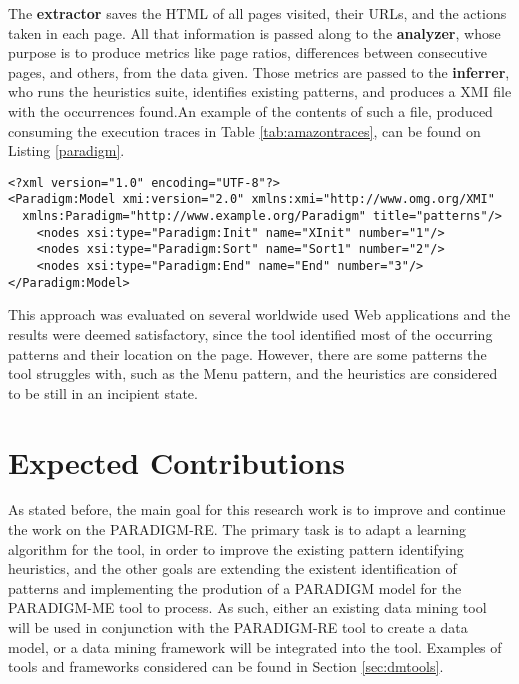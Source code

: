 The \textbf{extractor} saves the HTML of all pages visited, their URLs, and the actions taken in each page. All that information is passed along to the \textbf{analyzer}, whose purpose is to produce metrics like page ratios, differences between consecutive pages, and others, from the data given. Those metrics are passed to the \textbf{inferrer}, who runs the heuristics suite, identifies existing patterns, and produces a XMI file with the occurrences found.An example of the contents of such a file, produced consuming the execution traces in Table \ref{tab:amazontraces}, can be found on Listing \ref{paradigm}.

\begin{lstlisting}
<?xml version="1.0" encoding="UTF-8"?>
<Paradigm:Model xmi:version="2.0" xmlns:xmi="http://www.omg.org/XMI"
  xmlns:Paradigm="http://www.example.org/Paradigm" title="patterns"/>
	<nodes xsi:type="Paradigm:Init" name="XInit" number="1"/>
	<nodes xsi:type="Paradigm:Sort" name="Sort1" number="2"/>
	<nodes xsi:type="Paradigm:End" name="End" number="3"/>
</Paradigm:Model>
\end{lstlisting}

This approach was evaluated on several worldwide used Web applications and the results were deemed satisfactory, since the tool identified most of the occurring patterns and their location on the page. However, there are some patterns the tool struggles with, such as the Menu pattern, and the heuristics are considered to be still in an incipient state.

\section{Expected Contributions} \label{sec:project}

As stated before, the main goal for this research work is to improve and continue the work on the PARADIGM-RE. The primary task is to adapt a learning algorithm for the tool, in order to improve the existing pattern identifying heuristics, and the other goals are extending the existent identification of patterns and implementing the prodution of a PARADIGM model for the PARADIGM-ME tool to process. As such, either an existing data mining tool will be used in conjunction with the PARADIGM-RE tool to create a data model, or a data mining framework will be integrated into the tool. Examples of tools and frameworks considered can be found in Section \ref{sec:dmtools}. 

